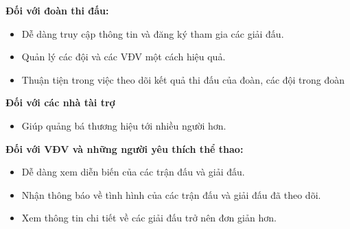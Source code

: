 \textbf{Đối với đoàn thi đấu:}
\begin{itemize}[itemindent=1cm, label={--}]
  \item Dễ dàng truy cập thông tin và đăng ký tham gia các giải đấu.
  \item Quản lý các đội và các VĐV một cách hiệu quả.
  \item Thuận tiện trong việc theo dõi kết quả thi đấu của đoàn, các đội trong đoàn
\end{itemize}

\textbf{Đối với các nhà tài trợ}
\begin{itemize}[itemindent=1cm, label={--}]
  \item Giúp quảng bá thương hiệu tới nhiều người hơn.
\end{itemize}

\textbf{Đối với VĐV và những người yêu thích thể thao:}
\begin{itemize}[itemindent=1cm, label={--}]
  \item Dễ dàng xem diễn biến của các trận đấu và giải đấu.
  \item Nhận thông báo về tình hình của các trận đấu và giải đấu đã theo dõi.
  \item Xem thông tin chi tiết về các giải đấu trở nên đơn giản hơn.
\end{itemize}

